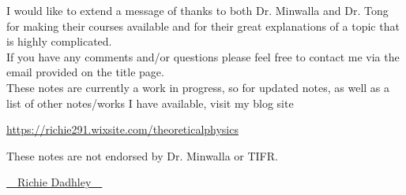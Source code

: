 \documentclass[11pt,oneside]{book}
\theoremstyle{definition} %
\theoremstyle{plain} %
\theoremstyle{remark} %
\theoremstyle{underline}
\begin{document}
I would like to extend a message of thanks to both Dr. Minwalla and Dr. Tong for making their courses available and for their great explanations of a topic that is highly complicated. \\

If you have any comments and/or questions please feel free to contact me via the email provided on the title page. \\

These notes are currently a work in progress, so for updated notes, as well as a list of other notes/works I have available, visit my blog site

\begin{center}
    \href{https://richie291.wixsite.com/theoreticalphysics}{https://richie291.wixsite.com/theoreticalphysics}
\end{center}

These notes are not endorsed by Dr. Minwalla or TIFR.

\vspace{1cm}

\begin{flushright}
    \Huge{{\cursive\setul{0.1ex}{}\ul{~~Richie Dadhley~~}}}
\end{flushright}



\tableofcontents


\mainmatter
























% 
% 



%
\end{document}
